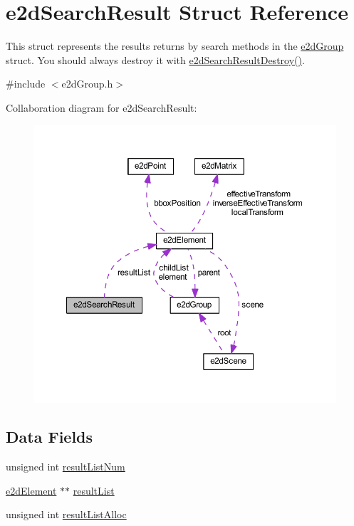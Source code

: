 \hypertarget{structe2dSearchResult}{\section{e2d\-Search\-Result Struct Reference}
\label{structe2dSearchResult}
}


This struct represents the results returns by search methods in the \hyperlink{structe2dGroup}{e2d\-Group} struct. You should always destroy it with \hyperlink{group__e2dGroup_ga0775c9a7e2ec5311263f84339afb52bc}{e2d\-Search\-Result\-Destroy()}.  




{\ttfamily \#include $<$e2d\-Group.\-h$>$}



Collaboration diagram for e2d\-Search\-Result\-:\nopagebreak
\begin{figure}[H]
\begin{center}
\leavevmode
\includegraphics[width=350pt]{structe2dSearchResult__coll__graph}
\end{center}
\end{figure}
\subsection*{Data Fields}
\begin{DoxyCompactItemize}
\item 
unsigned int \hyperlink{structe2dSearchResult_a65874957dc9197a16158b3807acb5d1e}{result\-List\-Num}
\item 
\hyperlink{structe2dElement}{e2d\-Element} $\ast$$\ast$ \hyperlink{structe2dSearchResult_acb54f0ae39cc6710460aa41f5f0afd9f}{result\-List}
\item 
unsigned int \hyperlink{structe2dSearchResult_a0b7370bba258bd87e0d7ae10af711d34}{result\-List\-Alloc}
\end{DoxyCompactItemize}


